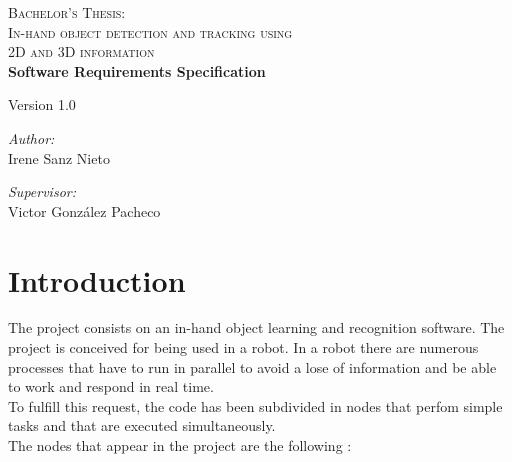 \documentclass{article}
\begin{document}
\begin{titlepage}

\begin{center}
\textsc{\huge Bachelor's Thesis:\\[0.5cm]In-hand object detection and tracking using\\[0.5cm]2D and 3D
information }\\[4cm]


{\Huge\bfseries{Software Requirements Specification}\\[2cm]}

\Large{Version 1.0}
\\[11cm]


\begin{minipage}{0.55\textwidth}
\begin{flushleft} \large
\emph{Author:}\\
Irene Sanz Nieto\\
\end{flushleft}
\end{minipage}
\begin{minipage}{0.4\textwidth}
\begin{flushright} \large
\emph{Supervisor:}\\
Victor González Pacheco\end{flushright}\end{minipage}\vfill


\end{center}
\end{titlepage}

%
\newpage
%
\tableofcontents
\listoffigures

\newpage


\section{Introduction}
\hspace{0.5cm}The project consists on an in-hand object learning and recognition software. 
The project is conceived for being used in a robot. In a robot there are numerous processes that have to run in parallel to avoid a lose of information and be able to work and respond in real time. 
\\
To fulfill this request, the code has been subdivided in nodes that perfom simple tasks and that are executed simultaneously. 
\\
The nodes that appear in the project are the following : 
\end{document}

